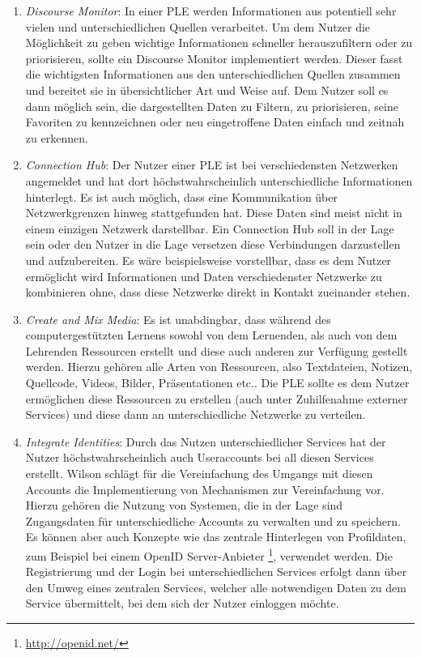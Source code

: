 \begin{enumerate}
 \item \emph{Discourse Monitor}\label{wilson_patterns:discourse_monitor}: In einer PLE werden Informationen aus potentiell sehr vielen und unterschiedlichen Quellen verarbeitet. Um dem Nutzer die Möglichkeit zu geben wichtige Informationen schneller herauszufiltern oder zu priorisieren, sollte ein Discourse Monitor implementiert werden. Dieser fasst die wichtigsten Informationen aus den unterschiedlichen Quellen zusammen und bereitet sie in übersichtlicher Art und Weise auf. Dem Nutzer soll es dann möglich sein, die dargestellten Daten zu Filtern, zu priorisieren, seine Favoriten zu kennzeichnen oder neu eingetroffene Daten einfach und zeitnah zu erkennen. 
 \item \emph{Connection Hub}: Der Nutzer einer PLE ist bei verschiedensten Netzwerken angemeldet und hat dort höchstwahrscheinlich unterschiedliche Informationen hinterlegt. Es ist auch möglich, dass eine Kommunikation über Netzwerkgrenzen hinweg stattgefunden hat. Diese Daten sind meist nicht in einem einzigen Netzwerk darstellbar. Ein Connection Hub soll in der Lage sein oder den Nutzer in die Lage versetzen diese Verbindungen darzustellen und aufzubereiten. Es wäre beispielsweise vorstellbar, dass es dem Nutzer ermöglicht wird Informationen und Daten verschiedenster Netzwerke zu kombinieren ohne, dass diese Netzwerke direkt in Kontakt zueinander stehen.
 \item \emph{Create and Mix Media}: Es ist unabdingbar, dass während des computergestützten Lernens sowohl von dem Lernenden, als auch von dem Lehrenden Ressourcen erstellt und diese auch anderen zur Verfügung gestellt werden. Hierzu gehören alle Arten von Ressourcen, also Textdateien, Notizen, Quellcode, Videos, Bilder, Präsentationen etc.. Die PLE sollte es dem Nutzer ermöglichen diese Ressourcen zu erstellen (auch unter Zuhilfenahme externer Services) und diese dann an unterschiedliche Netzwerke zu verteilen. 
 \item \emph{Integrate Identities}: Durch das Nutzen unterschiedlicher Services hat der Nutzer höchstwahrscheinlich auch Useraccounts bei all diesen Services erstellt. Wilson schlägt für die Vereinfachung des Umgangs mit diesen Accounts die Implementierung von Mechanismen zur Vereinfachung vor. Hierzu gehören die Nutzung von Systemen, die in der Lage sind Zugangsdaten für unterschiedliche Accounts zu verwalten und zu speichern. Es können aber auch Konzepte wie das zentrale Hinterlegen von Profildaten, zum Beispiel bei einem OpenID Server-Anbieter \footnote{\url{http://openid.net/}}, verwendet werden. Die Registrierung und der Login bei unterschiedlichen Services erfolgt dann über den Umweg eines zentralen Services, welcher alle notwendigen Daten zu dem Service übermittelt, bei dem sich der Nutzer einloggen möchte.  

\end{enumerate}
